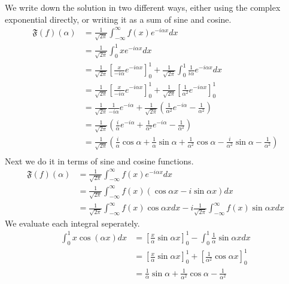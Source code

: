 \documentclass[11pt]{article}
\begin{document}
\begin{solution}     
    We write down the solution in two different ways, either using the complex exponential directly, or writing it as a sum of sine and cosine.
    \begin{align*}
        \mathfrak{F}(f)(\alpha)&=\frac{1}{\sqrt{2 \pi}} \int_{-\infty}^{\infty} f(x) e^{-i \alpha x} d x\\
        &=\frac{1}{\sqrt{2 \pi}} \int_{0}^{1} x e^{-i \alpha x} d x\\
        &=\frac{1}{\sqrt{2 \pi}} \left[ \frac{x}{-i\alpha} e^{-i \alpha x} \right]_0^1 + \frac{1}{\sqrt{2 \pi}} \int_{0}^{1} \frac{1}{i\alpha} e^{-i \alpha x} d x\\
        &=\frac{1}{\sqrt{2 \pi}} \left[ \frac{x}{-i\alpha} e^{-i \alpha x} \right]_0^1 + \frac{1}{\sqrt{2 \pi}} \left[ \frac{1}{\alpha^2} e^{-
        i \alpha x} \right]_{0}^1\\
        &=\frac{1}{\sqrt{2 \pi}} \frac{1}{-i\alpha} e^{-i \alpha } + \frac{1}{\sqrt{2 \pi}} \left( \frac{1}{\alpha^2} e^{-i \alpha} -\frac{1}{\alpha^2}\right)\\
        &=\frac{1}{\sqrt{2 \pi}}\left( \frac{i}{\alpha} e^{-i \alpha } + \frac{1}{\alpha^2} e^{-i \alpha} -\frac{1}{\alpha^2}\right)\\ 
        &=\frac{1}{\sqrt{2 \pi}}\left( \frac{i}{\alpha} \cos\alpha  + \frac{1}{\alpha} \sin\alpha + \frac{1}{\alpha^2} \cos\alpha - \frac{i}{\alpha^2} \sin\alpha -\frac{1}{\alpha^2}\right)\\ 
    \end{align*}
    Next we do it in terms of sine and cosine functions.
    $$
    \begin{aligned}
    \mathfrak{F}(f)(\alpha)&=\frac{1}{\sqrt{2 \pi}} \int_{-\infty}^{\infty} f(x) e^{-i \alpha x} d x\\
    &=\frac{1}{\sqrt{2 \pi}} \int_{-\infty}^{\infty} f(x)(\cos \alpha x - i\sin\alpha x) d x\\
    & = \frac{1}{\sqrt{2 \pi}} \int_{-\infty}^{\infty} f(x) \cos\alpha x d x - i\frac{1}{\sqrt{2 \pi}} \int_{-\infty}^{\infty} f(x) \sin\alpha x d x
    \end{aligned}
    $$
    We evaluate each integral seperately.
    $$\begin{aligned} \int_0^1 x \cos (\alpha x) d x & =\left[\frac{x}{\alpha} \sin \alpha x\right]_0^1-\int_0^1 \frac{1}{\alpha} \sin \alpha x d x \\ & =\left[\frac{x}{\alpha} \sin \alpha x\right]_0^1+\left[\frac{1}{\alpha^2} \cos \alpha x\right]_0^1 \\ & =\frac{1}{\alpha} \sin \alpha+\frac{1}{\alpha^2} \cos \alpha-\frac{1}{\alpha^2}\end{aligned}$$

\end{solution}
\end{document}
